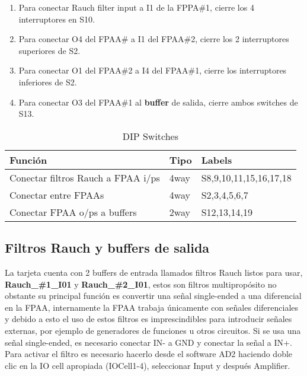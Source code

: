 	\begin{enumerate}
		\item Para conectar Rauch filter input a I1 de la FPPA\#{}1, cierre los 4 interruptores en S10.
		\item Para conectar O4 del FPAA\#{} a I1 del FPAA\#{}2, cierre los 2 interruptores superiores de S2.
		\item Para conectar O1 del FPAA\#{}2 a I4 del FPAA\#{}1, cierre los interruptores inferiores de S2.
		\item Para conectar O3 del FPAA\#{}1 al \textbf{buffer} de salida, cierre ambos switches de S13.
	\end{enumerate}

	\begin{table}[!ht]
		\centering
		\begin{tabular}{|l|l|l|}
			\hline
			\textbf{Función} &  \textbf{Tipo} & \textbf{Labels}\\
			\hline
			Conectar filtros Rauch a FPAA i/ps 					& 4way 		& S8,9,10,11,15,16,17,18		\\
			\hline
			Conectar entre FPAAs 						& 4way 	& S2,3,4,5,6,7	\\
			\hline
			Conectar FPAA o/ps a buffers 						& 2way 		& S12,13,14,19		\\
			\hline
		\end{tabular}
		\caption{DIP Switches}
		\label{tab:switches}
	\end{table}



	
	\subsection{Filtros Rauch y buffers de salida}
	
	La tarjeta cuenta con 2 buffers de entrada llamados filtros Rauch listos para usar, \textbf{Rauch\_\#1\_I01} y \textbf{Rauch\_\#2\_I01}, estos son filtros multipropósito no obstante su principal función es convertir una señal single-ended a una diferencial en la FPAA, internamente la FPAA trabaja únicamente con señales diferenciales y debido a esto el uso de estos filtros es imprescindibles para introducir señales externas, por ejemplo de generadores de funciones u otros circuitos. Si se usa una señal single-ended, es necesario conectar IN- a GND y conectar la señal a IN+.
	Para activar el filtro es necesario hacerlo desde el software AD2 haciendo doble clic en la IO cell apropiada (IOCell1-4), seleccionar Input y después Amplifier.
	
